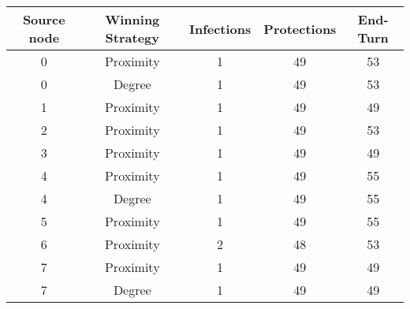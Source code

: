 \documentclass[results.tex]{subfiles}
\begin{document}
    \begin{center}
        \begin{tabular}{| c || c | c | c | c |}
            \hline
            {\bfseries Source node} & {\bfseries Winning Strategy} & {\bfseries Infections} & {\bfseries Protections}
            & {\bfseries End-Turn}
            \\  %
            \hline\hline
            0                       & Proximity                    & 1                      & 49                      & 53                   \\
            \hline
            0                       & Degree                       & 1                      & 49                      & 53                   \\
            \hline
            1                       & Proximity                    & 1                      & 49                      & 49                   \\
            \hline
            2                       & Proximity                    & 1                      & 49                      & 53                   \\
            \hline
            3                       & Proximity                    & 1                      & 49                      & 49                   \\
            \hline
            4                       & Proximity                    & 1                      & 49                      & 55                   \\
            \hline
            4                       & Degree                       & 1                      & 49                      & 55                   \\
            \hline
            5                       & Proximity                    & 1                      & 49                      & 55                   \\
            \hline
            6                       & Proximity                    & 2                      & 48                      & 53                   \\
            \hline
            7                       & Proximity                    & 1                      & 49                      & 49                   \\
            \hline
            7                       & Degree                       & 1                      & 49                      & 49                   \\

\end{tabular}
\end{center}
\end{document}
